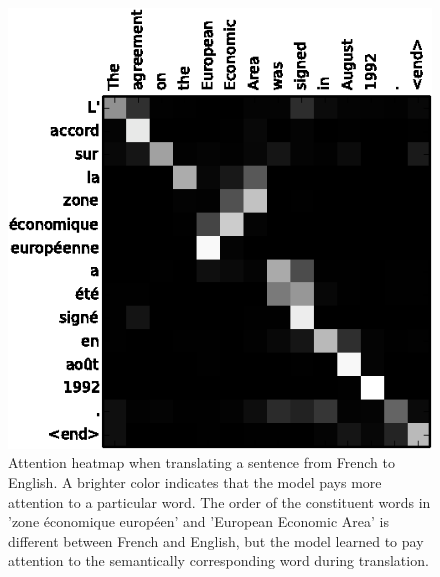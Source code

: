 
\begin{figure}
	\centering\includegraphics[width=1\textwidth]{../visualizations/ch4-methods/attention_heatmap.png} 
	\caption{Attention heatmap when translating a sentence from French to English. A brighter color indicates that the model pays more attention to a particular word. The order of the constituent words in 'zone \'economique europ\'een' and 'European Economic Area' is different between French and English, but the model learned to pay attention to the semantically corresponding word during translation. }
	\label{fig:attention_heatmap}
\end{figure}



